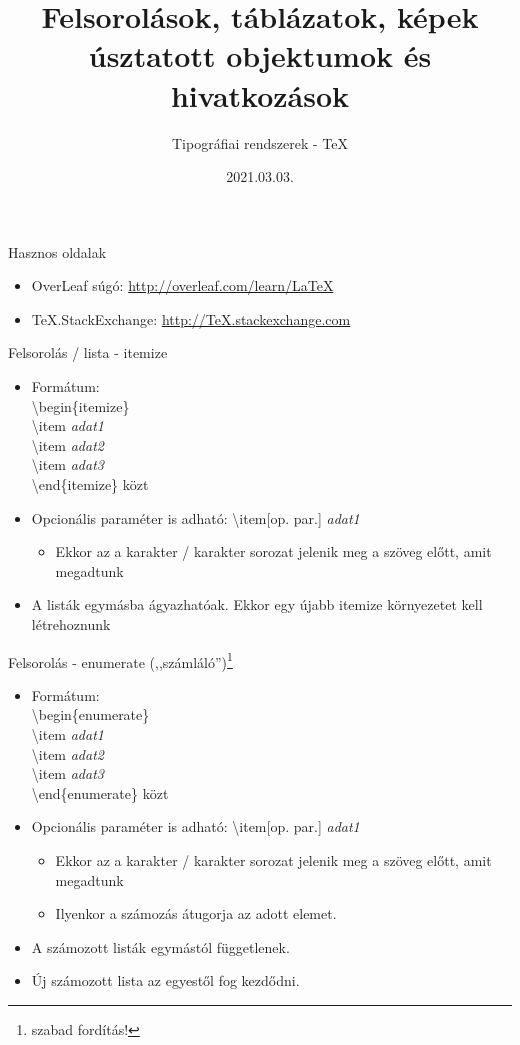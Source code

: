 \documentclass[11pt]{beamer}
\author{Tipográfiai rendszerek - \TeX}
\title{Felsorolások, táblázatok, képek \\ úsztatott objektumok és hivatkozások}
\date{2021.03.03.}
\newcommand{\tbs}{\textbackslash}
\begin{document}
 
 \begin{frame}
 \titlepage
 \end{frame}
 
\begin{frame}{Hasznos oldalak}
\begin{itemize}
\item	OverLeaf súgó: \href{https://overleaf.com/learn/latex}{http://overleaf.com/learn/\LaTeX{}}
\item 	\TeX{}.StackExchange: \href{https://tex.stackexchange.com}{http://\TeX{}.stackexchange.com}
\end{itemize}
\end{frame}

 \begin{frame}{Felsorolás / lista - itemize}
 \begin{itemize}
\item Formátum: \\ 
	\tbs begin\{itemize\} \\ 
	\tbs item \textit{adat1} \\ 
	\tbs item \textit{adat2} \\ 
	\tbs item \textit{adat3} \\ 
	\tbs end\{itemize\} közt
\item Opcionális paraméter is adható: \tbs item[op. par.] \textit{adat1}
	\begin{itemize}
	\item Ekkor az a karakter / karakter sorozat jelenik meg a szöveg előtt, amit megadtunk
	\end{itemize}
\item	A listák egymásba ágyazhatóak. Ekkor egy újabb itemize környezetet kell létrehoznunk
 \end{itemize}
 \end{frame}
 
 
\begin{frame}{Felsorolás - enumerate (,,számláló'')\footnote{szabad fordítás!}}
 \begin{itemize}
\item Formátum: \\ 
	\tbs begin\{enumerate\} \\ 
	\tbs item \textit{adat1} \\ 
	\tbs item \textit{adat2} \\ 
	\tbs item \textit{adat3} \\ 
	\tbs end\{enumerate\} közt
\item Opcionális paraméter is adható: \tbs item[op. par.] \textit{adat1}
	\begin{itemize}
	\item Ekkor az a karakter / karakter sorozat jelenik meg a szöveg előtt, amit megadtunk
	\item Ilyenkor a számozás átugorja az adott elemet.
	\end{itemize}
\item	A számozott listák egymástól függetlenek.
\item	Új számozott lista az egyestől fog kezdődni.
 \end{itemize}
\end{frame}
\end{document}
